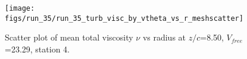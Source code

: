 \begin{figure}[H]
\centering
\texttt{[image: figs/run\_35/run\_35\_turb\_visc\_by\_vtheta\_vs\_r\_meshscatter]}
\caption{Scatter plot of mean total viscosity $\nu$ vs radius at $z/c$=8.50, $V_{free}$=23.29, station 4.}
\label{fig:run_35_turb_visc_by_vtheta_vs_r_meshscatter}
\end{figure}



